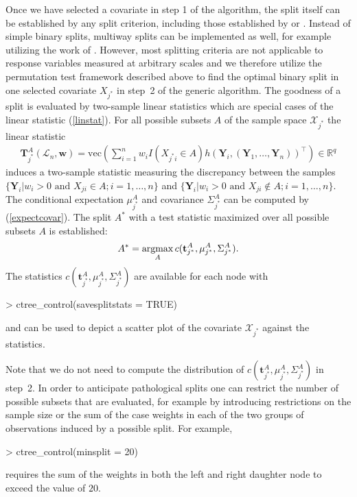 \documentclass{Z}
\newcommand{\R}{\mathbb{R} }
\newcommand{\argmax}{\operatorname{argmax}\displaylimits}
\newcommand{\LS}{\mathcal{L}_n}
\newcommand{\Y}{\mathbf{Y}}
\newcommand{\sX}{\mathcal{X}}
\newcommand{\T}{\mathbf{T}}
\newcommand{\w}{\mathbf{w}}
\renewcommand{\vec}{\text{vec}}
\newcommand{\bft}{\mathbf{t}}
\begin{document}
Once we have selected a covariate in step 1 of the algorithm, the split itself can be
established by any split criterion, including those established by
\cite{classifica:1984} or \cite{Shih1999}. Instead of simple binary splits, 
multiway splits can be implemented as well, for example utilizing
the work of \cite{OBrien2004}. However, most splitting criteria are not
applicable to response variables measured at arbitrary scales and we
therefore utilize the permutation test framework described above  
to find the optimal binary split in one selected 
covariate $X_{j^*}$ in step~2 of the generic algorithm. The goodness of a split is
evaluated by two-sample linear statistics which are special cases of the linear 
statistic (\ref{linstat}). 
For all possible subsets $A$ of the sample space $\sX_{j^*}$ the linear
statistic
\begin{eqnarray*}
\T^A_{j^*}(\LS, \w) = \vec \left( \sum_{i=1}^n w_i I(X_{j^*i} \in A) 
                                  h(\Y_i, (\Y_1, \dots, \Y_n))^\top \right) \in \R^{q}
\end{eqnarray*}
induces a two-sample statistic measuring the discrepancy between the samples 
$\{ \Y_i | w_i > 0 \text{ and } X_{ji} \in A; i = 1, \dots, n\}$ 
and $\{ \Y_i | w_i > 0 \text{ and } X_{ji} \not\in A; i = 1, \dots, n\}$. 
The conditional expectation $\mu_{j^*}^A$ and covariance
$\Sigma_{j^*}^A$
can be computed by (\ref{expectcovar}).
The split $A^*$ with a test statistic maximized over all possible
subsets $A$ is established:
\begin{eqnarray} \label{split}
A^* = \argmax_A c(\bft_{j^*}^A, \mu_{j^*}^A, \Sigma_{j^*}^A).
\end{eqnarray}
The statistics $c(\bft_{j^*}^A, \mu_{j^*}^A, \Sigma_{j^*}^A)$ are available
for each node with
\begin{Schunk}
\begin{Sinput}
> ctree_control(savesplitstats = TRUE)
\end{Sinput}
\end{Schunk}
and can be used to depict a scatter plot of the covariate
$\sX_{j^*}$ against the statistics.

Note that we do not need to compute the distribution of 
$c(\bft_{j^*}^A, \mu_{j^*}^A, \Sigma_{j^*}^A)$ in step~2. 
In order to anticipate pathological splits one can restrict the number of
possible subsets that are evaluated, for example by introducing restrictions
on the sample size or the sum of the case weights in each of the two groups
of observations induced by a possible split. For example,
\begin{Schunk}
\begin{Sinput}
> ctree_control(minsplit = 20)
\end{Sinput}
\end{Schunk}
requires the sum of the weights in both the left and right daughter 
node to exceed the value of $20$.
\end{document}
